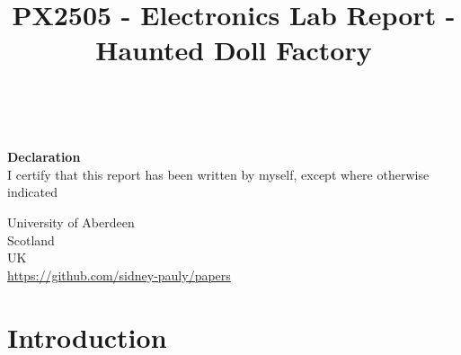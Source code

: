 \documentclass[14pt]{article}
\begin{document}
\lstset{
  language=Python,
  basicstyle=\small,          %
  keywordstyle=\bfseries,
  identifierstyle=,           %
  commentstyle=,              %
  stringstyle=\ttfamily,      %
  showstringspaces=false,     %
  numbers=left,
  numberstyle=\tiny,
  numbersep=5pt,
  frame=tb,
}

\title{PX2505 - Electronics Lab Report - Haunted Doll Factory }
\date{}
\def\theinstructor{}




\fancyhf{}



\begin{titlepage}
  \begin{center}
    \Large
    \textbf{\thetitle}
        
    \vspace{0.4cm}
    \large
    \thetitle
        
    \vspace{0.4cm}
    \textbf{\theauthor}\\
    \textbf{\theuoastudentid}

       
    \vspace{0.9cm}
    \textbf{Declaration}\\
    I certify that this report has been written by myself, except where otherwise
    indicated
  \end{center}

  \vfill

  \begin{center}

    University of Aberdeen\\
    Scotland\\
    UK\\
    \thedate
    \vspace{0.4cm}
    \url{https://github.com/sidney-pauly/papers}
  \end{center}
\end{titlepage}

\tableofcontents

\section{Introduction}
\end{document}
